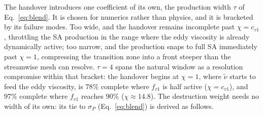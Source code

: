 \documentclass[journal]{new-aiaa}
\begin{document}
The handover introduces one coefficient of its own, the production
width $\tau$ of Eq.~\eqref{eq:blend}. It is chosen for numerics rather
than physics, and it is bracketed by its failure modes. Too wide, and the
handover remains incomplete past $\chi\!=\!c_{v1}$, throttling the SA
production in the range where the eddy viscosity is already dynamically
active; too narrow, and the production snaps to full SA immediately past
$\chi\!=\!1$, compressing the transition zone into a front steeper than
the streamwise mesh can resolve. $\tau\!=\!4$ spans the natural
window as a resolution compromise within that bracket: the handover begins
at $\chi\!=\!1$, where $\tilde\nu$ starts to feed the eddy viscosity, is
$78\%$ complete where $f_{v1}$ is half active ($\chi\!=\!c_{v1}$), and
$97\%$ complete where $f_{v1}$ reaches $90\%$ ($\chi\!\approx\!14.8$).
The destruction weight needs no width of its own: its tie to $\sigma_P$
(Eq.~\eqref{eq:blend}) is derived as follows.
\end{document}
